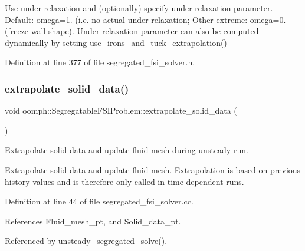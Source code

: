 Use under-\/relaxation and (optionally) specify under-\/relaxation parameter. Default\+: omega=1. (i.\+e. no actual under-\/relaxation; Other extreme\+: omega=0. (freeze wall shape). Under-\/relaxation parameter can also be computed dynamically by setting use\+\_\+irons\+\_\+and\+\_\+tuck\+\_\+extrapolation() 



Definition at line 377 of file segregated\+\_\+fsi\+\_\+solver.\+h.

\mbox{\label{classoomph_1_1SegregatableFSIProblem_a0e67b39cdae35ea25ef97e5e768aa60a}} 
\subsubsection{\texorpdfstring{extrapolate\+\_\+solid\+\_\+data()}{extrapolate\_solid\_data()}}
{\footnotesize\ttfamily void oomph\+::\+Segregatable\+F\+S\+I\+Problem\+::extrapolate\+\_\+solid\+\_\+data (\begin{DoxyParamCaption}{ }\end{DoxyParamCaption})\hspace{0.3cm}{\ttfamily [private]}}



Extrapolate solid data and update fluid mesh during unsteady run. 

Extrapolate solid data and update fluid mesh. Extrapolation is based on previous history values and is therefore only called in time-\/dependent runs. 

Definition at line 44 of file segregated\+\_\+fsi\+\_\+solver.\+cc.



References Fluid\+\_\+mesh\+\_\+pt, and Solid\+\_\+data\+\_\+pt.



Referenced by unsteady\+\_\+segregated\+\_\+solve().

\mbox{\label{classoomph_1_1SegregatableFSIProblem_ad0792ffce87f26d8963846c472f13d08}} 
